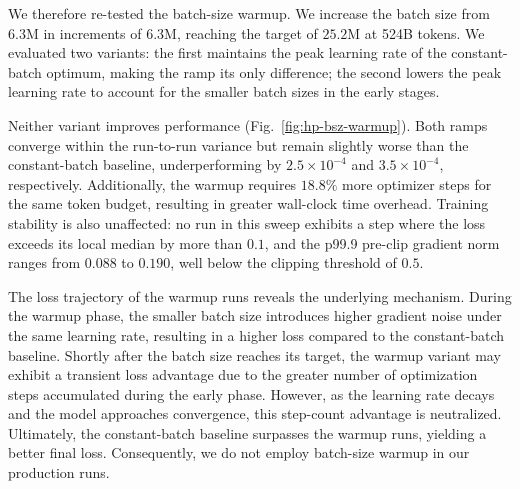 We therefore re-tested the batch-size warmup. 
We increase the batch size from $6.3$M in increments of $6.3$M, reaching the target of $25.2$M at 524B tokens. 
We evaluated two variants: the first maintains the peak learning rate of the constant-batch optimum, making the ramp its only difference; the second lowers the peak learning rate to account for the smaller batch sizes in the early stages.

Neither variant improves performance (Fig.~\ref{fig:hp-bsz-warmup}). 
Both ramps converge within the run-to-run variance but remain slightly worse than the constant-batch baseline, underperforming by $2.5\times10^{-4}$ and $3.5\times10^{-4}$, respectively. 
Additionally, the warmup requires $18.8\%$ more optimizer steps for the same token budget, resulting in greater wall-clock time overhead. 
Training stability is also unaffected: no run in this sweep exhibits a step where the loss exceeds its local median by more than $0.1$, and the p99.9 pre-clip gradient norm ranges from $0.088$ to $0.190$, well below the clipping threshold of $0.5$.

The loss trajectory of the warmup runs reveals the underlying mechanism. 
During the warmup phase, the smaller batch size introduces higher gradient noise under the same learning rate, resulting in a higher loss compared to the constant-batch baseline. 
Shortly after the batch size reaches its target, the warmup variant may exhibit a transient loss advantage due to the greater number of optimization steps accumulated during the early phase. 
However, as the learning rate decays and the model approaches convergence, this step-count advantage is neutralized. 
Ultimately, the constant-batch baseline surpasses the warmup runs, yielding a better final loss. 
Consequently, we do not employ batch-size warmup in our production runs.



